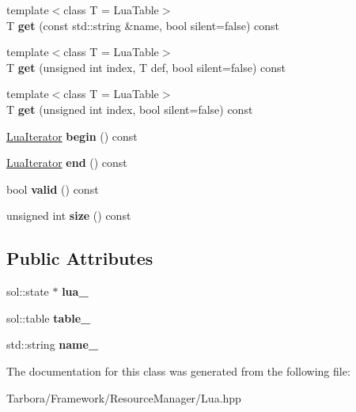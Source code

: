 \begin{DoxyCompactItemize}
\item 
\mbox{\label{classTarbora_1_1LuaTable_a531f6b4692cde60e436f4222e3ec3668}} 
{\footnotesize template$<$class T  = Lua\+Table$>$ }\\T {\bfseries get} (const std\+::string \&name, bool silent=false) const
\item 
\mbox{\label{classTarbora_1_1LuaTable_ad6c80d6b38d57874882d2664c554a3aa}} 
{\footnotesize template$<$class T  = Lua\+Table$>$ }\\T {\bfseries get} (unsigned int index, T def, bool silent=false) const
\item 
\mbox{\label{classTarbora_1_1LuaTable_ac8097267a2f037d51bba72cd1691a0e4}} 
{\footnotesize template$<$class T  = Lua\+Table$>$ }\\T {\bfseries get} (unsigned int index, bool silent=false) const
\item 
\mbox{\label{classTarbora_1_1LuaTable_a2229b6ffc7fd396e2d8d0ec353953d94}} 
\hyperlink{classTarbora_1_1LuaIterator}{Lua\+Iterator} {\bfseries begin} () const
\item 
\mbox{\label{classTarbora_1_1LuaTable_aa4f79bd0a74e1ecbeac996c1248bdde1}} 
\hyperlink{classTarbora_1_1LuaIterator}{Lua\+Iterator} {\bfseries end} () const
\item 
\mbox{\label{classTarbora_1_1LuaTable_a75eb2d387286bb13f75a0ca78b9895fb}} 
bool {\bfseries valid} () const
\item 
\mbox{\label{classTarbora_1_1LuaTable_a03bfb593ff73dba39e1f26cf46f54e97}} 
unsigned int {\bfseries size} () const
\end{DoxyCompactItemize}
\subsection*{Public Attributes}
\begin{DoxyCompactItemize}
\item 
\mbox{\label{classTarbora_1_1LuaTable_a8c7a129bedd6c382ac722eb665e5afa6}} 
sol\+::state $\ast$ {\bfseries lua\+\_\+}
\item 
\mbox{\label{classTarbora_1_1LuaTable_a655083e5da3c3651f3ccffc6312495a2}} 
sol\+::table {\bfseries table\+\_\+}
\item 
\mbox{\label{classTarbora_1_1LuaTable_ad807375aa0f2ac749e7250f57a590018}} 
std\+::string {\bfseries name\+\_\+}
\end{DoxyCompactItemize}


The documentation for this class was generated from the following file\+:\begin{DoxyCompactItemize}
\item 
Tarbora/\+Framework/\+Resource\+Manager/Lua.\+hpp\end{DoxyCompactItemize}
